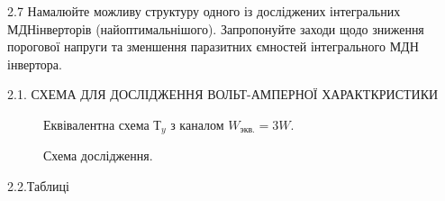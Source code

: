 \documentclass[a4paper,14pt]{extreport}
\begin{document}
2.7 Намалюйте можливу структуру одного із досліджених інтегральних МДНінверторів (найоптимальнішого). Запропонуйте заходи щодо зниження порогової напруги та зменшення паразитних ємностей інтегрального МДН інвертора.\\



\newpage
\begin{center}2.1. СХЕМА ДЛЯ ДОСЛІДЖЕННЯ ВОЛЬТ-АМПЕРНОЇ ХАРАКТКРИСТИКИ\\ \end{center}

\begin{figure}[h]
\caption{Еквівалентна схема $Т_y$ з каналом $W_{\text{экв.}}=3W$.}
\label{ris1}
\end{figure}

\begin{figure}[h]
\caption{Схема дослідження.}
\label{ris2}
\end{figure}

\begin{center}2.2.Таблиці\\ \end{center}
\newpage
\end{document}
